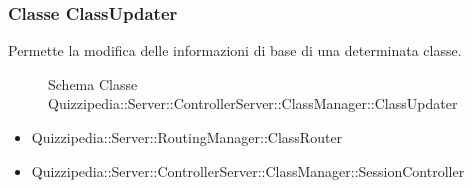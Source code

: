 \subsubsection{Classe ClassUpdater}
Permette la modifica delle informazioni di base di una determinata classe.
\begin{figure}[H]
\centering
\noindent{}
\caption[Schema Classe ClassUpdater]{Schema Classe Quizzipedia::Server::ControllerServer::ClassManager::ClassUpdater}
\end{figure}
\begin{itemize}
\item Quizzipedia::Server::RoutingManager::ClassRouter
\end{itemize}
\begin{itemize}
\item Quizzipedia::Server::ControllerServer::ClassManager::SessionController
\end{itemize}
